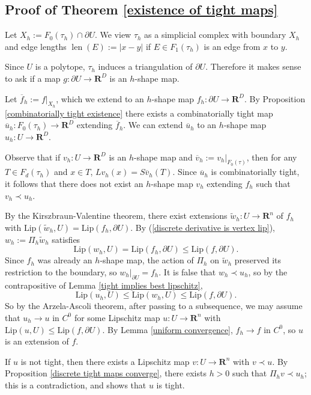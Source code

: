 \documentclass[reqno,11pt]{amsart}
\newcommand{\RR}{\mathbf{R}}
\DeclareMathOperator{\len}{len}
\newcommand{\Lip}{\mathrm{Lip}}
\theoremstyle{definition}
\numberwithin{equation}{section}
\begin{document}
\subsection{Proof of \texorpdfstring{Theorem \ref{existence of tight maps}}{the existence theorem}}
Let $X_h := F_0(\tau_h) \cap \partial U$.
We view $\tau_h$ as a simplicial complex with boundary $X_h$ and edge lengths $\len(E) := |x - y|$ if $E \in F_1(\tau_h)$ is an edge from $x$ to $y$.

Since $U$ is a polytope, $\tau_h$ induces a triangulation of $\partial U$.
Therefore it makes sense to ask if a map $g: \partial U \to \RR^D$ is an $h$-shape map.

Let $\overline f_h := f|_{X_h}$, which we extend to an $h$-shape map $f_h: \partial U \to \RR^D$.
By Proposition \ref{combinatorially tight existence} there exists a combinatorially tight map $\overline u_h: F_0(\tau_h) \to \RR^D$ extending $\overline f_h$.
We can extend $\overline u_h$ to an $h$-shape map $u_h: U \to \RR^D$.

Observe that if $v_h: U \to \RR^D$ is an $h$-shape map and $\overline v_h := v_h|_{F_0(\tau)}$, then for any $T \in F_d(\tau_h)$ and $x \in T$, $Lv_h(x) = S\overline v_h(T)$.
Since $\overline u_h$ is combinatorially tight, it follows that there does not exist an $h$-shape map $v_h$ extending $f_h$ such that $v_h \prec u_h$.

By the Kirszbraun-Valentine theorem, there exist extensions $\tilde w_h: U \to \RR^n$ of $f_h$ with $\Lip(\tilde w_h, U) = \Lip(f_h, \partial U)$.
By (\ref{discrete derivative is vertex lip}), $w_h := \Pi_h \tilde w_h$ satisfies
$$\Lip(w_h, U) = \Lip(f_h, \partial U) \leq \Lip(f, \partial U).$$
Since $f_h$ was already an $h$-shape map, the action of $\Pi_h$ on $\tilde w_h$ preserved its restriction to the boundary, so $w_h|_{\partial U} = f_h$.
It is false that $w_h \prec u_h$, so by the contrapositive of Lemma \ref{tight implies best lipschitz},
$$\Lip(u_h, U) \leq \Lip(w_h, U) \leq \Lip(f, \partial U).$$
So by the Arzela-Ascoli theorem, after passing to a subsequence, we may assume that $u_h \to u$ in $C^0$ for some Lipschitz map $u: U \to \RR^n$ with $\Lip(u, U) \leq \Lip(f, \partial U)$.
By Lemma \ref{uniform convergence}, $f_h \to f$ in $C^0$, so $u$ is an extension of $f$.

If $u$ is not tight, then there exists a Lipschitz map $v: U \to \RR^n$ with $v \prec u$.
By Proposition \ref{discrete tight maps converge}, there exists $h > 0$ such that $\Pi_h v \prec u_h$; this is a contradiction, and shows that $u$ is tight.
\end{document}
